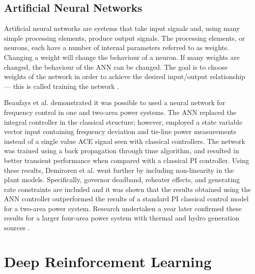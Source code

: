 \subsection{Artificial Neural Networks}
Artificial neural networks are systems that take input signals and, using many simple processing elements, produce output signals. The processing elements, or neurons, each have a number of internal parameters referred to as weights. Changing a weight will change the behaviour of a neuron. If many weights are changed, the behaviour of the ANN can be changed. The goal is to choose weights of the network in order to achieve the desired input/output relationship --- this is called training the network \cite{Nguyen1990}.

Beaufays et al. \cite{Beaufays1994} demonstrated it was possible to used a neural network for frequency control in one and two-area power systems. The ANN replaced the integral controller in the classical structure; however, employed a state variable vector input containing frequency deviation and tie-line power measurements instead of a single value ACE signal seen with classical controllers. The network was trained using a back propagation through time algorithm, and resulted in better transient performance when compared with a classical PI controller. Using these results, Demiroren et al. \cite{Demiroren2001} went further by including non-linearity in the plant models. Specifically, governor deadband, reheater effects, and generating rate constraints are included and it was shown that the results obtained using the ANN controller outperformed the results of a standard PI classical control model for a two-area power system. Research undertaken a year later confirmed these results for a larger four-area power system with thermal and hydro generation sources \cite{Zeynelgil2002}. 


\section{Deep Reinforcement Learning}

